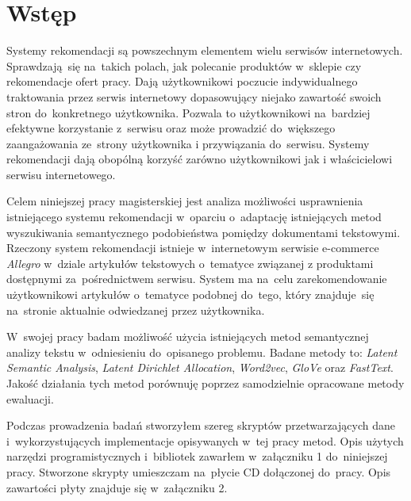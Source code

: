\documentclass[pl]{minipw} %
\begin{document}
\makestatement


\cleardoublepage
\tableofcontents


\cleardoublepage
\pagestyle{fancy}

\chapter*{Wstęp}
Systemy rekomendacji są powszechnym elementem wielu serwisów internetowych. Sprawdzają~się na~takich polach, jak polecanie produktów w~sklepie czy rekomendacje ofert pracy. Dają użytkownikowi poczucie indywidualnego traktowania przez serwis internetowy dopasowujący niejako zawartość swoich stron do~konkretnego użytkownika. Pozwala to użytkownikowi na~bardziej efektywne korzystanie z~serwisu oraz może prowadzić do~większego zaangażowania ze~strony użytkownika i przywiązania do~serwisu. Systemy rekomendacji dają obopólną korzyść zarówno użytkownikowi jak i właścicielowi serwisu internetowego.

Celem niniejszej pracy magisterskiej jest analiza możliwości usprawnienia istniejącego systemu rekomendacji w~oparciu o~adaptację istniejących metod wyszukiwania semantycznego podobieństwa pomiędzy dokumentami tekstowymi. Rzeczony system rekomendacji istnieje w~internetowym serwisie e-commerce \textit{Allegro} w~dziale artykułów tekstowych o~tematyce związanej z produktami dostępnymi za~pośrednictwem serwisu. System ma na~celu zarekomendowanie użytkownikowi artykułów o~tematyce podobnej do~tego, który znajduje~się na~stronie aktualnie odwiedzanej przez użytkownika.

W~swojej pracy badam możliwość użycia istniejących metod semantycznej analizy tekstu w~odniesieniu do~opisanego problemu. Badane metody to: \textit{Latent Semantic Analysis}, \textit{Latent Dirichlet Allocation}, \textit{Word2vec}, \textit{GloVe} oraz \textit{FastText}. Jakość działania tych metod porównuję poprzez samodzielnie opracowane metody ewaluacji.

Podczas prowadzenia badań stworzyłem szereg skryptów przetwarzających dane i~wykorzystujących implementacje opisywanych w~tej pracy metod. Opis użytych narzędzi programistycznych i~bibliotek zawarłem w~załączniku 1 do~niniejszej pracy. Stworzone skrypty umieszczam na~płycie CD dołączonej do~pracy. Opis zawartości płyty znajduje się w~załączniku 2.
\end{document}

